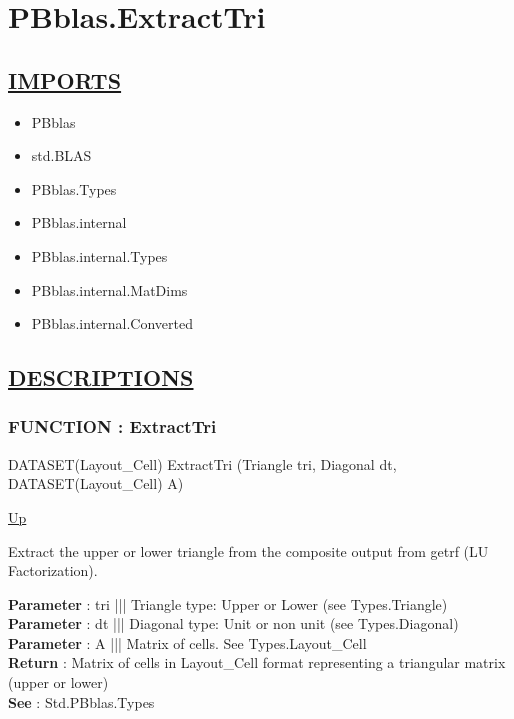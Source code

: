 \chapter*{PBblas.ExtractTri}
\hypertarget{ecldoc:toc:PBblas.ExtractTri}{}

\section*{\underline{IMPORTS}}
\begin{itemize}
\item PBblas
\item std.BLAS
\item PBblas.Types
\item PBblas.internal
\item PBblas.internal.Types
\item PBblas.internal.MatDims
\item PBblas.internal.Converted
\end{itemize}

\section*{\underline{DESCRIPTIONS}}
\subsection*{FUNCTION : ExtractTri}
\hypertarget{ecldoc:pbblas.extracttri}{}
\begin{minipage}[t]{\textwidth}
\begin{flushleft}
DATASET(Layout\_Cell) ExtractTri (Triangle tri, Diagonal dt, DATASET(Layout\_Cell) A)
\end{flushleft}
\end{minipage}
\hyperlink{ecldoc:toc:PBblas}{Up}

\par
Extract the upper or lower triangle from the composite output from getrf (LU Factorization).
\par
\textbf{Parameter} : tri ||| Triangle type: Upper or Lower (see Types.Triangle) \\
\textbf{Parameter} : dt ||| Diagonal type: Unit or non unit (see Types.Diagonal) \\
\textbf{Parameter} : A ||| Matrix of cells. See Types.Layout\_Cell \\
\textbf{Return} : Matrix of cells in Layout\_Cell format representing a triangular matrix (upper or lower) \\
\textbf{See} : Std.PBblas.Types \\
